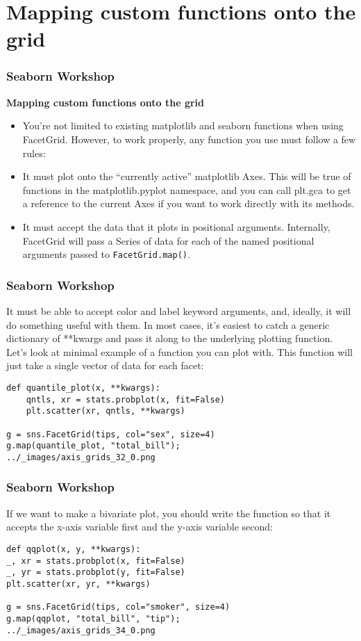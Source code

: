 \section{Mapping custom functions onto the grid}
\begin{frame}[fragile]
\frametitle{Seaborn Workshop}
\large
\noindent \textbf{Mapping custom functions onto the grid}
\begin{itemize}
\item You’re not limited to existing matplotlib and seaborn functions when using FacetGrid. However, to work properly, any function you use must follow a few rules:

\item It must plot onto the “currently active” matplotlib Axes. This will be true of functions in the matplotlib.pyplot namespace, and you can call plt.gca to get a reference to the current Axes if you want to work directly with its methods.
\item It must accept the data that it plots in positional arguments. Internally, FacetGrid will pass a Series of data for each of the named positional arguments passed to \texttt{FacetGrid.map()}.
\end{itemize}

\end{frame}
\begin{frame}[fragile]
\frametitle{Seaborn Workshop}
\large
It must be able to accept color and label keyword arguments, and, ideally, it will do something useful with them. In most cases, it’s easiest to catch a generic dictionary of **kwargs and pass it along to the underlying plotting function.
Let’s look at minimal example of a function you can plot with. This function will just take a single vector of data for each facet:

\begin{verbatim}
def quantile_plot(x, **kwargs):
    qntls, xr = stats.probplot(x, fit=False)
    plt.scatter(xr, qntls, **kwargs)

g = sns.FacetGrid(tips, col="sex", size=4)
g.map(quantile_plot, "total_bill");
../_images/axis_grids_32_0.png
\end{verbatim}

\end{frame}
\begin{frame}[fragile]
\frametitle{Seaborn Workshop}
\large
If we want to make a bivariate plot, you should write the function so that it accepts the x-axis variable first and the y-axis variable second:
\begin{verbatim}
def qqplot(x, y, **kwargs):
_, xr = stats.probplot(x, fit=False)
_, yr = stats.probplot(y, fit=False)
plt.scatter(xr, yr, **kwargs)

g = sns.FacetGrid(tips, col="smoker", size=4)
g.map(qqplot, "total_bill", "tip");
../_images/axis_grids_34_0.png
\end{verbatim}

\end{frame}
